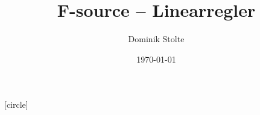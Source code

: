 \documentclass{beamer}
\title{F-source -- Linearregler}
\author{Dominik Stolte}
\institute[{Hochschule Mannheim}]{Hochschule Mannheim}
\date{\today}
\begin{document}
 
[circle]

\begin{frame}
  \titlepage{}
\end{frame}
\end{document}
